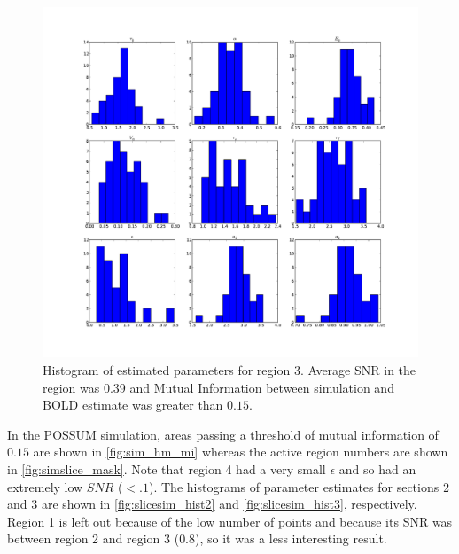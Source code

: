 \documentclass[journal]{./IEEEtran}
\begin{document}
\begin{figure}[!t] %
\centering
\includegraphics[clip=true,trim=2.5cm 2cm 2cm 1cm,width=15cm]{images/slicesim_hist3}
\caption{Histogram of estimated parameters for region 3. Average SNR in the 
region was 
$0.39$ and Mutual Information between simulation and BOLD estimate was greater 
than $0.15$.}
\label{fig:slicesim_hist3}
\end{figure}

In the POSSUM simulation, areas passing a threshold of
mutual information of $0.15$  are shown in 
\autoref{fig:sim_hm_mi}
whereas the active region numbers are shown in 
\autoref{fig:simslice_mask}.
Note that region 4 had a very small $\epsilon$ and so
had an extremely low $SNR$ ($<.1$). The histograms of parameter
estimates for sections
2 and 3 are shown in \autoref{fig:slicesim_hist2} and 
\autoref{fig:slicesim_hist3}, respectively. Region 1 is
left out because of the low number of points and because
its SNR was between region 2 and region 3 ($0.8$), so it
was a less interesting result.
\end{document}
